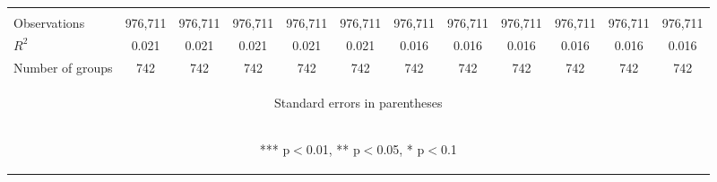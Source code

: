 \documentclass[]{article}
\begin{document}
\begin{center}
\begin{tabular}{lccccccccccc}
\vspace{4pt} & \begin{footnotesize}\end{footnotesize} & \begin{footnotesize}\end{footnotesize} & \begin{footnotesize}\end{footnotesize} & \begin{footnotesize}\end{footnotesize} & \begin{footnotesize}\end{footnotesize} & \begin{footnotesize}\end{footnotesize} & \begin{footnotesize}\end{footnotesize} & \begin{footnotesize}\end{footnotesize} & \begin{footnotesize}\end{footnotesize} & \begin{footnotesize}\end{footnotesize} & \begin{footnotesize}\end{footnotesize} \\
Observations & 976,711 & 976,711 & 976,711 & 976,711 & 976,711 & 976,711 & 976,711 & 976,711 & 976,711 & 976,711 & 976,711 \\
$R^2$ & 0.021 & 0.021 & 0.021 & 0.021 & 0.021 & 0.016 & 0.016 & 0.016 & 0.016 & 0.016 & 0.016 \\
 Number of groups & 742 & 742 & 742 & 742 & 742 & 742 & 742 & 742 & 742 & 742 & 742 \\ \hline
\multicolumn{12}{c}{\begin{footnotesize} Standard errors in parentheses\end{footnotesize}} \\
\multicolumn{12}{c}{\begin{footnotesize} *** p$<$0.01, ** p$<$0.05, * p$<$0.1\end{footnotesize}} \\
\end{tabular}
\end{center}
\end{document}
